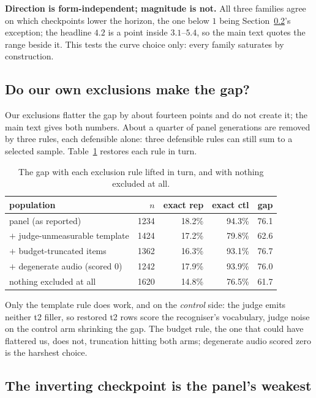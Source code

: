 \noindent\textbf{Direction is form-independent; magnitude is not.} All three families agree on
which checkpoints lower the horizon, the one below $1$ being Section~\ref{sec:weakest}'s
exception; the headline $4.2$ is a point inside $3.1$--$5.4$, so the main text quotes the range
beside it. This tests the curve choice only: every family saturates by construction.

\subsection{Do our own exclusions make the gap?}
\label{sec:exclusions}

Our exclusions flatter the gap by about fourteen points and do not create it; the main text
gives both numbers. About a quarter of panel generations are removed by three rules, each
defensible alone: three defensible rules can still sum to a selected sample.
Table~\ref{tab:exclsens} restores each rule in turn.

\begin{table}[tp]\centering
\caption{The gap with each exclusion rule lifted in turn, and with nothing excluded at all.}
\label{tab:exclsens}
\begin{tabular}{lrrrr}
\toprule
population & $n$ & exact rep & exact ctl & gap \\
\midrule
panel (as reported)   & 1234 & 18.2\% & 94.3\% & 76.1 \\
$+$ judge-unmeasurable template & 1424 & 17.2\% & 79.8\% & 62.6 \\
$+$ budget-truncated items & 1362 & 16.3\% & 93.1\% & 76.7 \\
$+$ degenerate audio (scored 0) & 1242 & 17.9\% & 93.9\% & 76.0 \\
nothing excluded at all & 1620 & 14.8\% & 76.5\% & 61.7 \\
\bottomrule
\end{tabular}
\end{table}

\noindent Only the template rule does work, and on the \emph{control} side: the judge emits
neither t2 filler, so restored t2 rows score the recogniser's vocabulary, judge noise on the
control arm shrinking the gap. The budget rule, the one that could have flattered us, does not,
truncation hitting both arms; degenerate audio scored zero is the harshest choice.

\subsection{The inverting checkpoint is the panel's weakest}
\label{sec:weakest}


